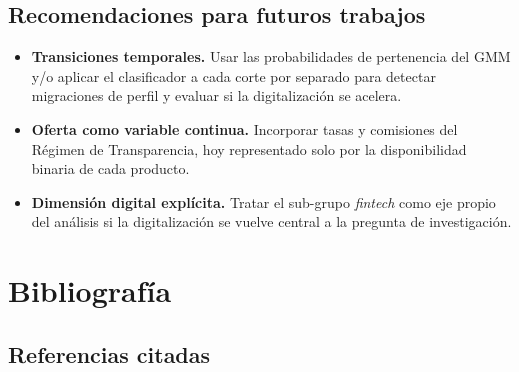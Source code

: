 \documentclass[11pt,a4paper]{article}
\begin{document}
\subsection{Recomendaciones para futuros trabajos}

\begin{itemize}
  \item \textbf{Transiciones temporales.} Usar las probabilidades de pertenencia
  del GMM y/o aplicar el clasificador a cada corte por separado para detectar migraciones de perfil y evaluar
  si la digitalización se acelera.
  \item \textbf{Oferta como variable continua.} Incorporar tasas y comisiones del Régimen de Transparencia, hoy
  representado solo por la disponibilidad binaria de cada producto.
  \item \textbf{Dimensión digital explícita.} Tratar el sub-grupo \textit{fintech} como eje propio del análisis
  si la digitalización se vuelve central a la pregunta de investigación.
\end{itemize}

\clearpage
\section{Bibliografía}

\subsection{Referencias citadas}
\end{document}

